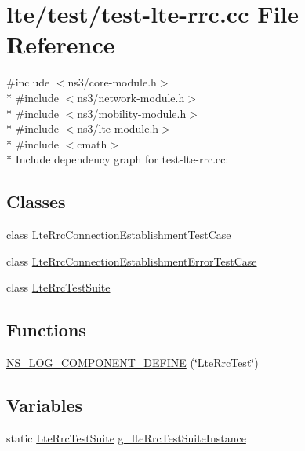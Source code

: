 \hypertarget{test-lte-rrc_8cc}{}\section{lte/test/test-\/lte-\/rrc.cc File Reference}
\label{test-lte-rrc_8cc}
{\ttfamily \#include $<$ns3/core-\/module.\+h$>$}\\*
{\ttfamily \#include $<$ns3/network-\/module.\+h$>$}\\*
{\ttfamily \#include $<$ns3/mobility-\/module.\+h$>$}\\*
{\ttfamily \#include $<$ns3/lte-\/module.\+h$>$}\\*
{\ttfamily \#include $<$cmath$>$}\\*
Include dependency graph for test-\/lte-\/rrc.cc\+:
\subsection*{Classes}
\begin{DoxyCompactItemize}
\item 
class \hyperlink{classLteRrcConnectionEstablishmentTestCase}{Lte\+Rrc\+Connection\+Establishment\+Test\+Case}
\item 
class \hyperlink{classLteRrcConnectionEstablishmentErrorTestCase}{Lte\+Rrc\+Connection\+Establishment\+Error\+Test\+Case}
\item 
class \hyperlink{classLteRrcTestSuite}{Lte\+Rrc\+Test\+Suite}
\end{DoxyCompactItemize}
\subsection*{Functions}
\begin{DoxyCompactItemize}
\item 
\hyperlink{test-lte-rrc_8cc_aff52dc6e75fe4bbe43dc409ca61a41e0}{N\+S\+\_\+\+L\+O\+G\+\_\+\+C\+O\+M\+P\+O\+N\+E\+N\+T\+\_\+\+D\+E\+F\+I\+NE} (\char`\"{}Lte\+Rrc\+Test\char`\"{})
\end{DoxyCompactItemize}
\subsection*{Variables}
\begin{DoxyCompactItemize}
\item 
static \hyperlink{classLteRrcTestSuite}{Lte\+Rrc\+Test\+Suite} \hyperlink{test-lte-rrc_8cc_a4635cb3de25e6deb708d8f6bb235cf6c}{g\+\_\+lte\+Rrc\+Test\+Suite\+Instance}
\end{DoxyCompactItemize}



